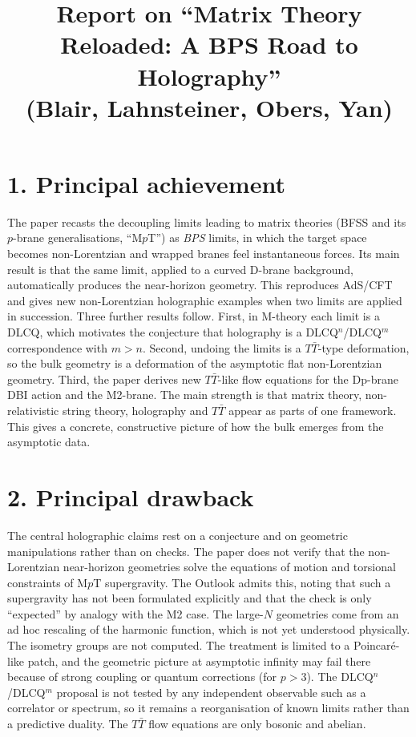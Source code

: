 \documentclass[11pt]{article}
\title{Report on ``Matrix Theory Reloaded: A BPS Road to Holography''\\(Blair, Lahnsteiner, Obers, Yan)}
\date{}
\begin{document}
\maketitle

\section*{1. Principal achievement}
The paper recasts the decoupling limits leading to matrix theories (BFSS and its $p$-brane generalisations, ``M$p$T'') as \emph{BPS} limits, in which the target space becomes non-Lorentzian and wrapped branes feel instantaneous forces. Its main result is that the same limit, applied to a curved D-brane background, automatically produces the near-horizon geometry. This reproduces AdS/CFT and gives new non-Lorentzian holographic examples when two limits are applied in succession. Three further results follow. First, in M-theory each limit is a DLCQ, which motivates the conjecture that holography is a DLCQ$^n$/DLCQ$^m$ correspondence with $m>n$. Second, undoing the limits is a $T\bar T$-type deformation, so the bulk geometry is a deformation of the asymptotic flat non-Lorentzian geometry. Third, the paper derives new $T\bar T$-like flow equations for the Dp-brane DBI action and the M2-brane. The main strength is that matrix theory, non-relativistic string theory, holography and $T\bar T$ appear as parts of one framework. This gives a concrete, constructive picture of how the bulk emerges from the asymptotic data.

\section*{2. Principal drawback}
The central holographic claims rest on a conjecture and on geometric manipulations rather than on checks. The paper does not verify that the non-Lorentzian near-horizon geometries solve the equations of motion and torsional constraints of M$p$T supergravity. The Outlook admits this, noting that such a supergravity has not been formulated explicitly and that the check is only ``expected'' by analogy with the M2 case. The large-$N$ geometries come from an ad hoc rescaling of the harmonic function, which is not yet understood physically. The isometry groups are not computed. The treatment is limited to a Poincar\'e-like patch, and the geometric picture at asymptotic infinity may fail there because of strong coupling or quantum corrections (for $p>3$). The DLCQ$^n$/DLCQ$^m$ proposal is not tested by any independent observable such as a correlator or spectrum, so it remains a reorganisation of known limits rather than a predictive duality. The $T\bar T$ flow equations are only bosonic and abelian.
\end{document}
